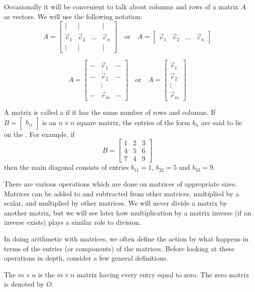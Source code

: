 \documentclass{ximera}
\begin{document}
Occasionally it will be convenient to talk about columns and rows of a matrix $A$ as vectors.  We will use the following notation:
$$A=\begin{bmatrix}|&|&&|\\\vec{c}_1& \vec{c}_2 &\ldots & \vec{c}_n\\|&|&&|\end{bmatrix}\quad\text{or}\quad A=\begin{bmatrix}\vec{c}_1& \vec{c}_2 &\ldots & \vec{c}_n\end{bmatrix}$$

$$A=\begin{bmatrix}
- & \vec{r}_1 & - \\ - & \vec{r}_2 & - \\ & \vdots & \\ - & \vec{r}_m & -
\end{bmatrix}\quad\text{or}\quad A=\begin{bmatrix}\vec{r}_1\\\vec{r}_2\\\vdots\\\vec{r}_m\end{bmatrix}$$

A matrix is called a  if it has the same number of rows and columns.
If $B=\begin{bmatrix}b_{ij}\end{bmatrix}$ is an $n \times n$ square matrix, the entries of the form $b_{ii}$ are said to lie on the .  For example, if $$B=\begin{bmatrix}1&2&3\\4&5&6\\7&4&9\end{bmatrix}$$
then the main diagonal consists of entries $b_{11}=1$, $b_{22}=5$ and $b_{33}=9$.

There are various operations which are done on matrices of appropriate 
sizes. Matrices can be added to and subtracted from other matrices,
multiplied by a scalar, and multiplied by other matrices. We will
never divide a matrix by another matrix, but we will see later how multiplication by a matrix inverse (if an inverse exists) plays a similar role to division. 

In doing arithmetic with matrices, we often define the action by what
happens in terms of the entries (or components) of the
matrices. Before looking at these operations in depth, consider a few
general definitions.

\begin{definition}\label{def:zeromatrix}
The $m\times n$  is the $m\times n$ matrix
having every entry equal to zero. The zero matrix is
denoted by $O$.
\end{definition}
\end{document}
